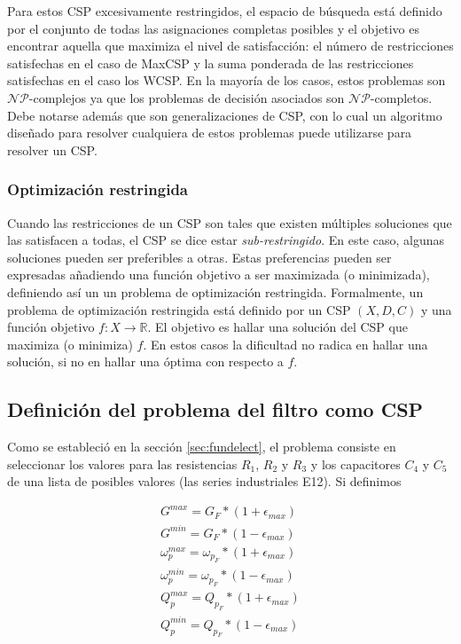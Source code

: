 \documentclass{llncs}
\begin{document}
	Para estos CSP excesivamente restringidos, el espacio de búsqueda está definido por el
	conjunto de todas las asignaciones completas posibles y el objetivo es encontrar aquella que maximiza el nivel de satisfacción: el número de restricciones satisfechas en el caso de MaxCSP y
	la suma ponderada de las restricciones satisfechas en el caso los WCSP. En la mayoría de los
	casos, estos problemas son $\mathcal{NP}$-complejos ya que los problemas de decisión asociados son $\mathcal{NP}$-completos. Debe notarse además que son generalizaciones de
	CSP, con lo cual un algoritmo diseñado para resolver cualquiera de estos problemas puede
	utilizarse para resolver un CSP.
	
	\subsubsection{Optimización restringida}
	Cuando las restricciones de un CSP son tales que existen múltiples soluciones que las satisfacen a todas, el CSP se dice estar \textit{sub-restringido}. En este caso, algunas soluciones
	pueden ser preferibles a otras. Estas preferencias pueden ser expresadas añadiendo una función
	objetivo a ser maximizada (o minimizada), definiendo así un un problema de optimización
	restringida. Formalmente, un problema de optimización restringida está definido por un CSP
	$(X, D, C)$ y una función objetivo $f: X \rightarrow \mathbb{R}$. El objetivo es hallar una solución del CSP 
	que maximiza (o minimiza) $f$. En estos casos la dificultad no radica en hallar una solución, 
	si no en hallar una óptima con respecto a $f$.
	
	\subsection{Definición del problema del filtro como CSP}
		\label{subsec:problemDefinition}
		Como se estableció en la sección \ref{sec:fundelect}, el problema consiste en seleccionar
		los valores para las resistencias $R_1$, $R_2$ y $R_3$ y los capacitores $C_4$ y $C_5$ de
		una lista de posibles valores (las series industriales E12). Si definimos
		
		\begin{align*}
		G^{max} = G_F * (1 + \epsilon_{max})\\
		G^{min} = G_F * (1 - \epsilon_{max})\\
		\omega_p^{max} = \omega_{p_F} * (1 + \epsilon_{max})\\
		\omega_p^{min} = \omega_{p_F} * (1 - \epsilon_{max})\\
		Q_p^{max} = Q_{p_F} * (1 + \epsilon_{max})\\
		Q_p^{min} = Q_{p_F} * (1 - \epsilon_{max})
		\end{align*}
		
\end{document}
